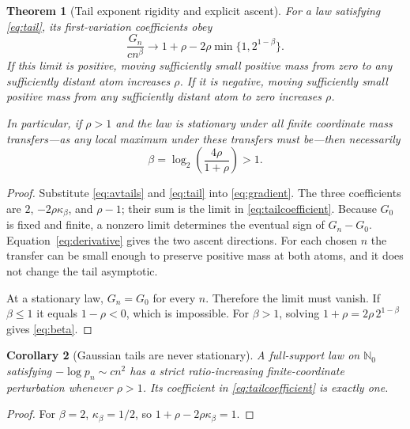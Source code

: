 \documentclass[11pt]{article}
\newtheorem{theorem}{Theorem}[section]
\newtheorem{corollary}[theorem]{Corollary}
\theoremstyle{remark}\newtheorem{remark}[theorem]{Remark}
\newcommand{\N}{\mathbb N_0}
\begin{document}
\begin{theorem}[Tail exponent rigidity and explicit ascent]\label{thm:tail}
For a law satisfying \eqref{eq:tail}, its first-variation coefficients obey
\begin{equation}\label{eq:tailcoefficient}
 \boxed{\ \frac{G_n}{c n^\beta}\longrightarrow
 1+\rho-2\rho\min\{1,2^{1-\beta}\}.\ }
\end{equation}
If this limit is positive, moving sufficiently small positive mass from
zero to any sufficiently distant atom increases $\rho$. If it is negative,
moving sufficiently small positive mass from any sufficiently distant atom
to zero increases $\rho$.

In particular, if $\rho>1$ and the law is stationary under all finite
coordinate mass transfers---as any local maximum under these transfers must
be---then necessarily
\begin{equation}\label{eq:beta}
 \boxed{\ \beta=\log_2\!\left(\frac{4\rho}{1+\rho}\right)>1.\ }
\end{equation}
\end{theorem}
\begin{proof}
Substitute \eqref{eq:avtails} and \eqref{eq:tail} into \eqref{eq:gradient}.
The three coefficients are $2$, $-2\rho\kappa_\beta$, and $\rho-1$;
their sum is the limit in \eqref{eq:tailcoefficient}. Because $G_0$ is fixed
and finite, a nonzero limit determines the eventual sign of $G_n-G_0$.
Equation~\eqref{eq:derivative} gives the two ascent directions. For each
chosen $n$ the transfer can be small enough to preserve positive mass at
both atoms, and it does not change the tail asymptotic.

At a stationary law, $G_n=G_0$ for every $n$. Therefore the limit must
vanish. If $\beta\leq1$ it equals $1-\rho<0$, which is impossible.
For $\beta>1$, solving
$1+\rho=2\rho\,2^{1-\beta}$ gives \eqref{eq:beta}.
\end{proof}

\begin{corollary}[Gaussian tails are never stationary]\label{cor:gaussian}
A full-support law on $\N$ satisfying $-\log p_n\sim c n^2$ has a strict
ratio-increasing finite-coordinate perturbation whenever $\rho>1$.
Its coefficient in \eqref{eq:tailcoefficient} is exactly one.
\end{corollary}
\begin{proof}
For $\beta=2$, $\kappa_\beta=1/2$, so $1+\rho-2\rho\kappa_\beta=1$.
\end{proof}
\end{document}
